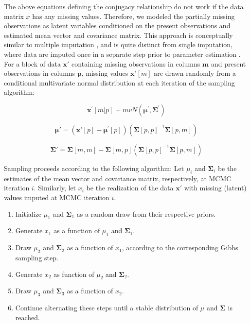 \documentclass{article}
\begin{document}
The above equations defining the conjugacy relationship do not work if the data matrix $x$ has any missing values.
Therefore, we modeled the partially missing observations as latent variables conditioned on the present observations and estimated mean vector and covariance matrix.
This approach is conceptually similar to multiple imputation \citep{white_2010_multiple,graham_2009_missing_data_analysis},
and is quite distinct from single imputation, where data are imputed once in a separate step prior to parameter estimation \citep{white_2010_multiple,graham_2009_missing_data_analysis}.
For a block of data $\bm{x\prime}$ containing missing observations in columns $\bm{m}$ and present observations in columns $\bm{p}$,
missing values $\bm{x\prime}[m]$ are drawn randomly from a conditional multivariate normal distribution at each iteration of the sampling algorithm:

\begin{equation}
\bm{x^\prime}[m|p] \sim mvN(\bm{\mu}^\prime, \bm{\Sigma}^\prime)
\end{equation}

\begin{equation}
\bm{\mu\prime} =
(\bm{x\prime}[p] - \bm{\mu^\prime}[p])
(\bm{\Sigma}[p,p]^{-1} \bm{\Sigma}[p,m])
\end{equation}

\begin{equation}
\bm{\Sigma\prime} = \bm{\Sigma}[m,m] -
\bm{\Sigma}[m,p]
(\bm{\Sigma}[p,p]^{-1} \bm{\Sigma}[p,m])
\end{equation}

Sampling proceeds according to the following algorithm:
Let $\mu_i$ and $\bm{\Sigma}_i$ be the estimates of the mean vector and covariance matrix, respectively, at MCMC iteration $i$.
Similarly, let $x_i$ be the realization of the data $\bm{x}\prime$ with missing (latent) values imputed at MCMC iteration $i$.

\begin{enumerate}
\item Initialize $\mu_1$ and $\bm{\Sigma}_1$ as a random draw from their respective priors.
\item Generate $x_1$ as a function of $\mu_1$ and $\bm{\Sigma}_1$.
\item Draw $\mu_2$ and $\bm{\Sigma}_2$ as a function of $x_1$, according to the corresponding Gibbs sampling step.
\item Generate $x_2$ as function of $\mu_2$ and $\bm{\Sigma}_2$.
\item Draw $\mu_3$ and $\bm{\Sigma}_3$ as a function of $x_2$.
\item Continue alternating these steps until a stable distribution of $\mu$ and $\bm{\Sigma}$ is reached.
\end{enumerate}
\end{document}
